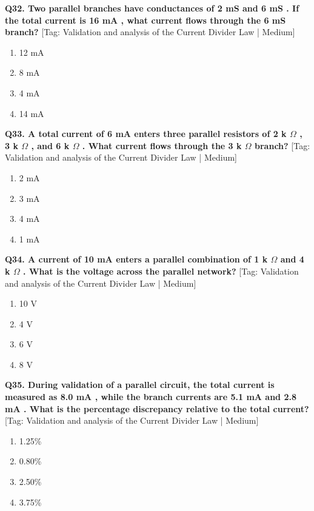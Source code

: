 \noindent\textbf{Q32. Two parallel branches have conductances of 2 mS and 6 mS . If the total current is 16 mA , what current flows through the 6 mS branch?} \hfill [Tag: Validation and analysis of the Current Divider Law | Medium]
\begin{enumerate}[label=(\alph*),topsep=2pt,itemsep=1pt,partopsep=0pt,parsep=0pt]
    \item {12 mA}
    \item {8 mA}
    \item {4 mA}
    \item {14 mA}
\end{enumerate}
\vspace{2mm}

\noindent\textbf{Q33. A total current of 6 mA enters three parallel resistors of 2 k $\Omega$ , 3 k $\Omega$ , and 6 k $\Omega$ . What current flows through the 3 k $\Omega$ branch?} \hfill [Tag: Validation and analysis of the Current Divider Law | Medium]
\begin{enumerate}[label=(\alph*),topsep=2pt,itemsep=1pt,partopsep=0pt,parsep=0pt]
    \item {2 mA}
    \item {3 mA}
    \item {4 mA}
    \item {1 mA}
\end{enumerate}
\vspace{2mm}

\noindent\textbf{Q34. A current of 10 mA enters a parallel combination of 1 k $\Omega$ and 4 k $\Omega$ . What is the voltage across the parallel network?} \hfill [Tag: Validation and analysis of the Current Divider Law | Medium]
\begin{enumerate}[label=(\alph*),topsep=2pt,itemsep=1pt,partopsep=0pt,parsep=0pt]
    \item {10 V}
    \item {4 V}
    \item {6 V}
    \item {8 V}
\end{enumerate}
\vspace{2mm}

\noindent\textbf{Q35. During validation of a parallel circuit, the total current is measured as 8.0 mA , while the branch currents are 5.1 mA and 2.8 mA . What is the percentage discrepancy relative to the total current?} \hfill [Tag: Validation and analysis of the Current Divider Law | Medium]
\begin{enumerate}[label=(\alph*),topsep=2pt,itemsep=1pt,partopsep=0pt,parsep=0pt]
    \item {1.25\%}
    \item {0.80\%}
    \item {2.50\%}
    \item {3.75\%}
\end{enumerate}
\vspace{2mm}

